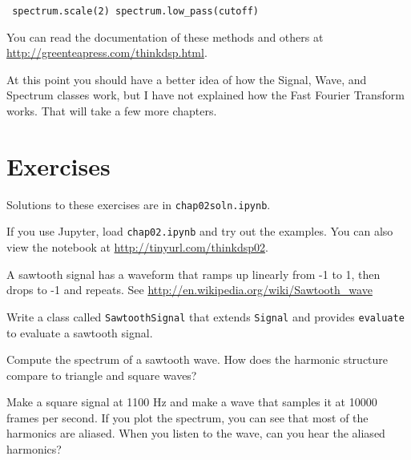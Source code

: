 \documentclass[12pt]{book} \usepackage[width=5.5in,height=8.5in, hmarginratio=3:2,vmarginratio=1:1]{geometry}
\begin{document}
\begin{verbatim} spectrum.scale(2) spectrum.low_pass(cutoff) \end{verbatim} 

You can read the documentation of these methods and others at \url{http://greenteapress.com/thinkdsp.html}. 

At this point you should have a better idea of how the Signal, Wave, and Spectrum classes work, but I have not explained how the Fast Fourier Transform works. That will take a few more chapters. 

\section{Exercises} 

Solutions to these exercises are in {\tt chap02soln.ipynb}. 

\begin{exercise} If you use Jupyter, load {\tt chap02.ipynb} and try out the examples. You can also view the notebook at \url{http://tinyurl.com/thinkdsp02}. \end{exercise} 

\begin{exercise} A sawtooth signal has a waveform that ramps up linearly from -1 to 1, then drops to -1 and repeats. See \url{http://en.wikipedia.org/wiki/Sawtooth_wave} 

Write a class called {\tt SawtoothSignal} that extends {\tt Signal} and provides {\tt evaluate} to evaluate a sawtooth signal. 

Compute the spectrum of a sawtooth wave. How does the harmonic structure compare to triangle and square waves? \end{exercise} 

\begin{exercise} Make a square signal at 1100 Hz and make a wave that samples it at 10000 frames per second. If you plot the spectrum, you can see that most of the harmonics are aliased. When you listen to the wave, can you hear the aliased harmonics? \end{exercise} 
\end{document}
